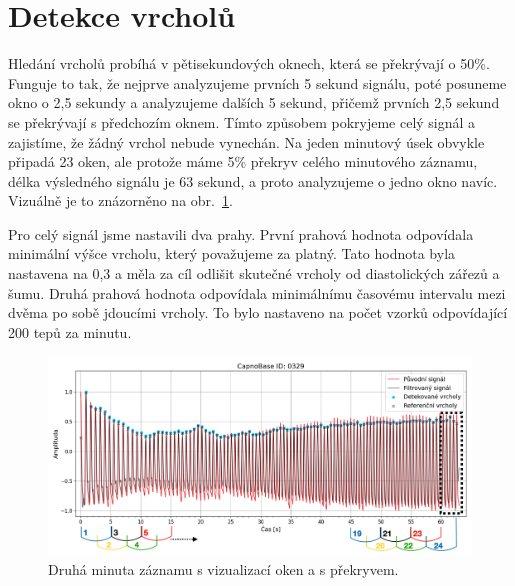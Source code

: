 \section{Detekce vrcholů}
\label{sec:alg_peaks}
Hledání vrcholů probíhá v pětisekundových oknech, která se překrývají o 50\%.
Funguje to tak, že nejprve analyzujeme prvních 5 sekund signálu, poté posuneme okno o 2,5 sekundy a analyzujeme dalších 5 sekund, přičemž prvních 2,5 sekund se překrývají s předchozím oknem.
Tímto způsobem pokryjeme celý signál a zajistíme, že žádný vrchol nebude vynechán.
Na jeden minutový úsek obvykle připadá 23 oken, ale protože máme 5\% překryv celého minutového záznamu, délka výsledného signálu je 63 sekund, a proto analyzujeme o jedno okno navíc.
Vizuálně je to znázorněno na obr.~\ref{fig:my-detection}.

Pro celý signál jsme nastavili dva prahy.
První prahová hodnota odpovídala minimální výšce vrcholu, který považujeme za platný.
Tato hodnota byla nastavena na 0,3 a měla za cíl odlišit skutečné vrcholy od diastolických zářezů a šumu.
Druhá prahová hodnota odpovídala minimálnímu časovému intervalu mezi dvěma po sobě jdoucími vrcholy.
To bylo nastaveno na počet vzorků odpovídající 200 tepů za minutu.

\begin{figure} [h]
	\label{fig:my-detection}
	\centering
	\includegraphics[width=1\textwidth]{./obrazky/My_peaks.png}
	\caption[Vlastní detekce vrcholů]{Druhá minuta záznamu s vizualizací oken a s překryvem.}
\end{figure}

